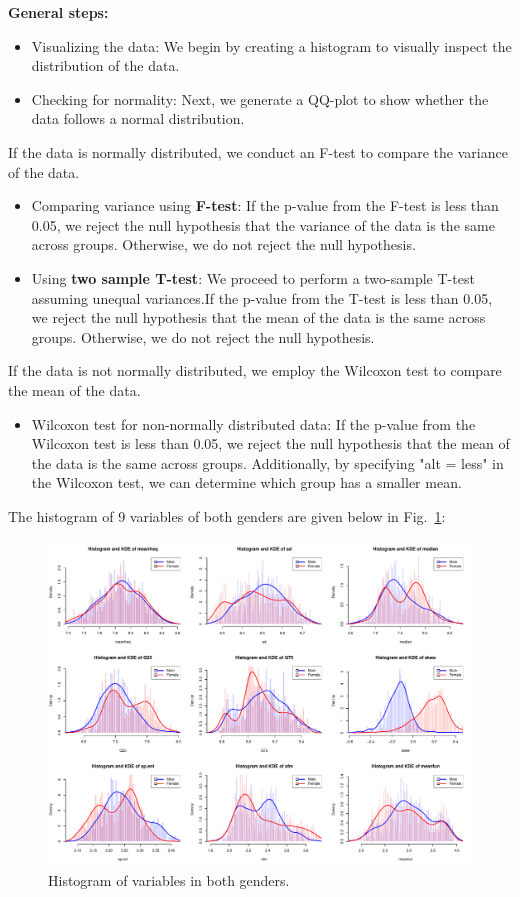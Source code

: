 \documentclass{article}
\begin{document}
	\textbf{General steps:}
	\begin{itemize}
		\item Visualizing the data: We begin by creating a histogram to visually inspect the distribution of the data.
		\item Checking for normality: Next, we generate a QQ-plot to show whether the data follows a normal distribution.
	\end{itemize}
	If the data is normally distributed, we conduct an F-test to compare the variance of the data.
	\begin{itemize}
		\item Comparing variance using \textbf{F-test}: If the p-value from the F-test is less than 0.05, we reject the null hypothesis that the variance of the data is the same across groups. Otherwise, we do not reject the null hypothesis.
		\item Using \textbf{two sample T-test}: We proceed to perform a two-sample T-test assuming unequal variances.If the p-value from the T-test is less than 0.05, we reject the null hypothesis that the mean of the data is the same across groups. Otherwise, we do not reject the null hypothesis.
	\end{itemize}
	If the data is not normally distributed, we employ the Wilcoxon test to compare the mean of the data.
	\begin{itemize}
		\item Wilcoxon test for non-normally distributed data: If the p-value from the Wilcoxon test is less than 0.05, we reject the null hypothesis that the mean of the data is the same across groups. Additionally, by specifying "alt = less" in the Wilcoxon test, we can determine which group has a smaller mean.
	\end{itemize}
	The histogram of 9 variables of both genders are given below in Fig.~\ref{hist_bothgender}:
	\begin{figure}
		\centering
		\includegraphics[width=\textwidth]{graphs/gender/visualizations.pdf}
		\caption{Histogram of variables in both genders.}
		\label{hist_bothgender}
	\end{figure}
	
\end{document}
